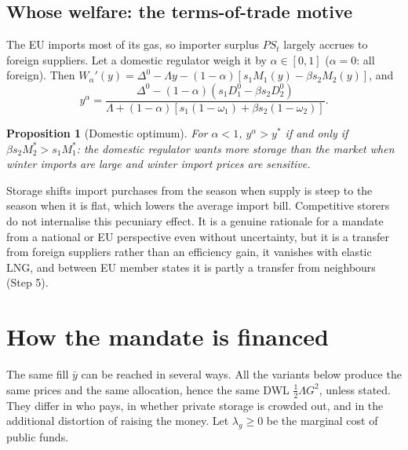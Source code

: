 \documentclass[11pt]{article}
\newtheorem{proposition}{Proposition}
\theoremstyle{definition}
\newcommand{\ybar}{\bar y}
\newcommand{\Dz}{\Delta^{0}}
\begin{document}
\subsection{Whose welfare: the terms-of-trade motive}\label{sec:whose}
The EU imports most of its gas, so importer surplus $PS_t$ largely accrues to foreign suppliers. Let a
domestic regulator weigh it by $\alpha\in[0,1]$ ($\alpha=0$: all foreign). Then
$W_\alpha'(y)=\Dz-\Lambda y-(1-\alpha)\left[s_1M_1(y)-\beta s_2M_2(y)\right]$, and
\begin{equation}
y^{\alpha}=\frac{\Dz-(1-\alpha)\left(s_1D_1^0-\beta s_2D_2^0\right)}
{\Lambda+(1-\alpha)\left[s_1(1-\omega_1)+\beta s_2(1-\omega_2)\right]} .
\end{equation}

\begin{proposition}[Domestic optimum]\label{prop:tot}
For $\alpha<1$, $y^\alpha>y^*$ if and only if $\beta s_2M_2^*>s_1M_1^*$: the domestic regulator wants more
storage than the market when winter imports are large and winter import prices are sensitive.
\end{proposition}

Storage shifts import purchases from the season when supply is steep to the season when it is flat, which
lowers the average import bill. Competitive storers do not internalise this pecuniary effect. It is a
genuine rationale for a mandate from a national or EU perspective even without uncertainty, but it is a
transfer from foreign suppliers rather than an efficiency gain, it vanishes with elastic LNG, and between
EU member states it is partly a transfer from neighbours (Step 5).

\section{How the mandate is financed}\label{sec:financing}

The same fill $\ybar$ can be reached in several ways. All the variants below produce the same prices and
the same allocation, hence the same DWL $\frac12\Lambda G^2$, unless stated. They differ in who pays,
in whether private storage is crowded out, and in the additional distortion of raising the money. Let
$\lambda_g\ge 0$ be the marginal cost of public funds.
\end{document}
